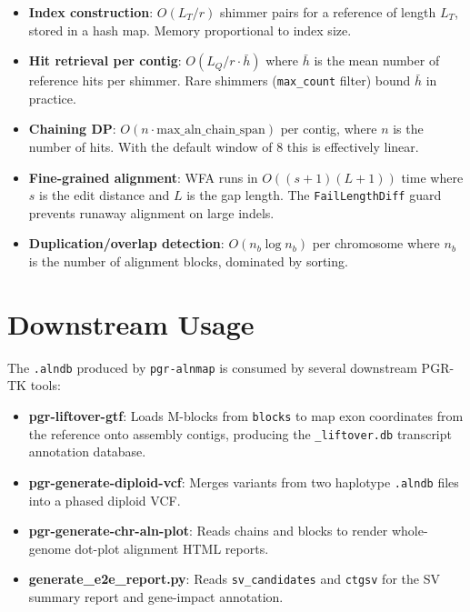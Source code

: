 \documentclass[11pt,a4paper]{article}
\begin{document}
\begin{itemize}
  \item \textbf{Index construction}: $O(L_T / r)$ shimmer pairs for a reference of
        length $L_T$, stored in a hash map.  Memory proportional to index size.

  \item \textbf{Hit retrieval per contig}: $O(L_Q / r \cdot \bar{h})$ where $\bar{h}$
        is the mean number of reference hits per shimmer.  Rare shimmers
        (\texttt{max\_count} filter) bound $\bar{h}$ in practice.

  \item \textbf{Chaining DP}: $O(n \cdot \text{max\_aln\_chain\_span})$ per contig,
        where $n$ is the number of hits.  With the default window of 8 this is
        effectively linear.

  \item \textbf{Fine-grained alignment}: WFA runs in $O((s+1)(L+1))$ time where
        $s$ is the edit distance and $L$ is the gap length.
        The \texttt{FailLengthDiff} guard prevents runaway alignment on
        large indels.

  \item \textbf{Duplication/overlap detection}: $O(n_b \log n_b)$ per chromosome
        where $n_b$ is the number of alignment blocks, dominated by sorting.
\end{itemize}

\section{Downstream Usage}
\label{sec:downstream}

The \texttt{.alndb} produced by \texttt{pgr-alnmap} is consumed by several
downstream PGR-TK tools:

\begin{itemize}
  \item \textbf{pgr-liftover-gtf}: Loads M-blocks from \texttt{blocks} to map
        exon coordinates from the reference onto assembly contigs, producing
        the \texttt{\_liftover.db} transcript annotation database.
  \item \textbf{pgr-generate-diploid-vcf}: Merges variants from two haplotype
        \texttt{.alndb} files into a phased diploid VCF.
  \item \textbf{pgr-generate-chr-aln-plot}: Reads chains and blocks to render
        whole-genome dot-plot alignment HTML reports.
  \item \textbf{generate\_e2e\_report.py}: Reads \texttt{sv\_candidates} and
        \texttt{ctgsv} for the SV summary report and gene-impact annotation.
\end{itemize}
\end{document}
